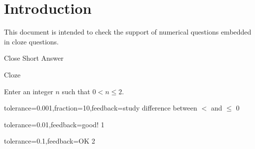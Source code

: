\documentclass{article}
\begin{document}
\section*{Introduction}

This document is intended to check the support of numerical questions 
embedded in cloze questions.

\begin{quiz}{Close Short Answer}

\begin{cloze}{Cloze}
\begin{numerical}
Enter an integer $n$ such that $0< n\leq 2$.
\item[tolerance=0.001,fraction={10},feedback={study difference between $<$ and 
$\leq$}] 0
\item[tolerance=0.01,feedback={good!}] 1
\item[tolerance=0.1,feedback={OK}] 2
\end{numerical}
\end{cloze}

\end{quiz}
\end{document}
